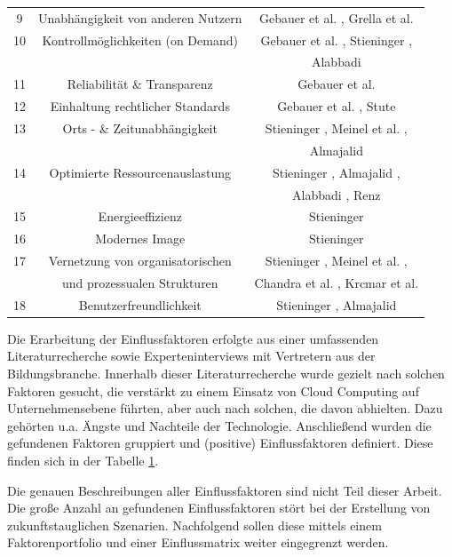 \begin{table}[!tbp]
\begin{center}
{\begin{tabular}{c c c }
				9 & Unabhängigkeit von anderen Nutzern & Gebauer et al. \cite{gebauer}, Grella et al. \cite{grella} \\
				10 & Kontrollmöglichkeiten (on Demand) & Gebauer et al. \cite{gebauer}, Stieninger \cite{stieninger}, \\
				&& Alabbadi \cite{alabbadi} \\
				11 & Reliabilität \& Transparenz & Gebauer et al. \cite{gebauer} \\
				12 & Einhaltung rechtlicher Standards & Gebauer et al. \cite{gebauer}, Stute \cite{stute} \\
				13 & Orts - \& Zeitunabhängigkeit & Stieninger \cite{stieninger}, Meinel et al. \cite{meinel} \cite{meinel2}, \\
				&& Almajalid \cite{almajalid} \\
				14 & Optimierte Ressourcenauslastung & Stieninger \cite{stieninger}, Almajalid \cite{almajalid}, \\
				&& Alabbadi \cite{alabbadi}, Renz \cite{renz} \\
				15 & Energieeffizienz & Stieninger \cite{stieninger} \\
				16 & Modernes Image & Stieninger \cite{stieninger} \\
				17 & Vernetzung von organisatorischen & Stieninger \cite{stieninger}, Meinel et al. \cite{meinel}, \\
				& und prozessualen Strukturen & Chandra et al. \cite{chandra}, Krcmar et al. \cite{krcmar} \\
				18 & Benutzerfreundlichkeit & Stieninger \cite{stieninger}, Almajalid \cite{almajalid} \\
				\hline
			\end{tabular}
		}
		\label{tab:factors1}
	\end{center}
\end{table}
\FloatBarrier

Die Erarbeitung der Einflussfaktoren erfolgte aus einer umfassenden Literaturrecherche sowie Experteninterviews mit Vertretern aus der Bildungsbranche. Innerhalb dieser Literaturrecherche wurde gezielt nach solchen Faktoren gesucht, die verstärkt zu einem Einsatz von Cloud Computing auf Unternehmensebene führten, aber auch nach solchen, die davon abhielten. Dazu gehörten u.a. Ängste und Nachteile der Technologie. Anschließend wurden die gefundenen Faktoren gruppiert und (positive) Einflussfaktoren definiert. Diese finden sich in der Tabelle \ref{tab:factors1}.

Die genauen Beschreibungen aller Einflussfaktoren sind nicht Teil dieser Arbeit. Die große Anzahl an gefundenen Einflussfaktoren stört bei der Erstellung von zukunftstauglichen Szenarien. Nachfolgend sollen diese mittels einem Faktorenportfolio und einer Einflussmatrix weiter eingegrenzt werden.


